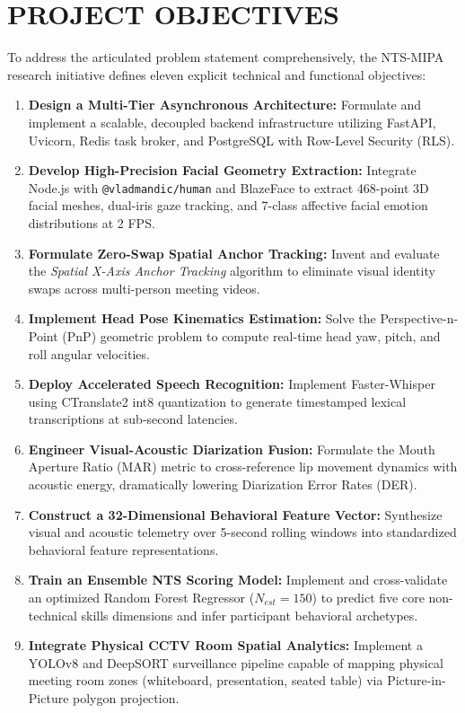 \documentclass[12pt,a4paper,oneside]{report}
\begin{document}
\section{PROJECT OBJECTIVES}
To address the articulated problem statement comprehensively, the NTS-MIPA research initiative defines eleven explicit technical and functional objectives:
\begin{enumerate}
    \item \textbf{Design a Multi-Tier Asynchronous Architecture:} Formulate and implement a scalable, decoupled backend infrastructure utilizing FastAPI, Uvicorn, Redis task broker, and PostgreSQL with Row-Level Security (RLS).
    \item \textbf{Develop High-Precision Facial Geometry Extraction:} Integrate Node.js with \texttt{@vladmandic/human} and BlazeFace to extract 468-point 3D facial meshes, dual-iris gaze tracking, and 7-class affective facial emotion distributions at 2 FPS.
    \item \textbf{Formulate Zero-Swap Spatial Anchor Tracking:} Invent and evaluate the \textit{Spatial X-Axis Anchor Tracking} algorithm to eliminate visual identity swaps across multi-person meeting videos.
    \item \textbf{Implement Head Pose Kinematics Estimation:} Solve the Perspective-n-Point (PnP) geometric problem to compute real-time head yaw, pitch, and roll angular velocities.
    \item \textbf{Deploy Accelerated Speech Recognition:} Implement Faster-Whisper using CTranslate2 int8 quantization to generate timestamped lexical transcriptions at sub-second latencies.
    \item \textbf{Engineer Visual-Acoustic Diarization Fusion:} Formulate the Mouth Aperture Ratio (MAR) metric to cross-reference lip movement dynamics with acoustic energy, dramatically lowering Diarization Error Rates (DER).
    \item \textbf{Construct a 32-Dimensional Behavioral Feature Vector:} Synthesize visual and acoustic telemetry over 5-second rolling windows into standardized behavioral feature representations.
    \item \textbf{Train an Ensemble NTS Scoring Model:} Implement and cross-validate an optimized Random Forest Regressor ($N_{est}=150$) to predict five core non-technical skills dimensions and infer participant behavioral archetypes.
    \item \textbf{Integrate Physical CCTV Room Spatial Analytics:} Implement a YOLOv8 and DeepSORT surveillance pipeline capable of mapping physical meeting room zones (whiteboard, presentation, seated table) via Picture-in-Picture polygon projection.

\end{enumerate}
\end{document}
